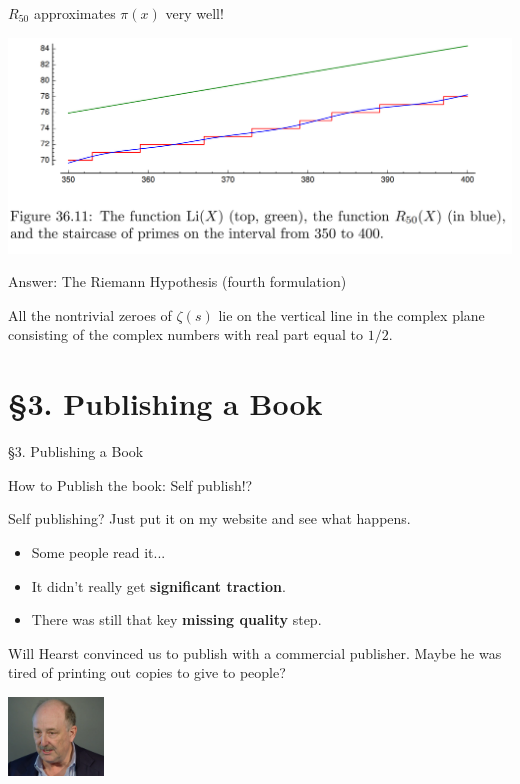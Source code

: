 \documentclass{beamer}
\newcommand{\mysection}[2]{\section{\S#1. #2}%
\begin{frame}{}
\vfill
\begin{center}
\hrulefill
\vfill
\Huge\sc \S#1. #2
\vfill
\hrulefill
\end{center}
\vfill
\end{frame}}
\begin{document}
\begin{frame}{$R_{50}$ approximates $\pi(x)$ very well!}

  \includegraphics[height=.55\textheight]{pics/Li-R50-pi}

\end{frame}



\begin{frame}{Answer: The Riemann Hypothesis (fourth formulation)}
  \begin{block}{}
    All the nontrivial zeroes of $\zeta(s)$ lie on the vertical
    line in the complex plane consisting of the
    complex numbers with real part equal to $1/2$.
  \end{block}
\end{frame}


\mysection{3}{Publishing a Book}

\begin{frame}{How to Publish the book:  Self publish!?}
  \begin{block}{Self publishing?}
    Just put it on my website and see what happens.
    \begin{itemize}
      \item Some people read it...
      \item It didn't really get \textbf{significant traction}.
      \item There was still that key \textbf{missing quality} step.
    \end{itemize}
  \end{block}
  \vfill
  Will Hearst convinced us to publish with a commercial publisher.
  Maybe he was tired of printing out copies to give to people?

\begin{flushright}

  \includegraphics[width=1in]{pics/will-msri}
\end{flushright}

\end{frame}
\end{document}
